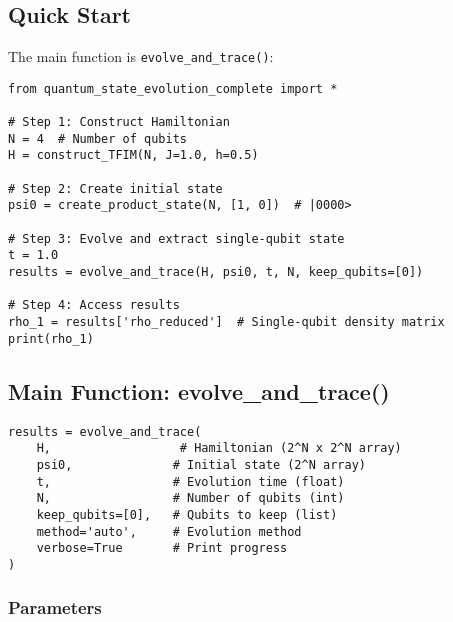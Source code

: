 \documentclass[11pt,a4paper]{article}
\begin{document}
\subsection{Quick Start}

The main function is \texttt{evolve\_and\_trace()}:

\begin{lstlisting}[caption={Basic usage}]
from quantum_state_evolution_complete import *

# Step 1: Construct Hamiltonian
N = 4  # Number of qubits
H = construct_TFIM(N, J=1.0, h=0.5)

# Step 2: Create initial state
psi0 = create_product_state(N, [1, 0])  # |0000>

# Step 3: Evolve and extract single-qubit state
t = 1.0
results = evolve_and_trace(H, psi0, t, N, keep_qubits=[0])

# Step 4: Access results
rho_1 = results['rho_reduced']  # Single-qubit density matrix
print(rho_1)
\end{lstlisting}

\subsection{Main Function: evolve\_and\_trace()}

\begin{lstlisting}[caption={Complete function signature}]
results = evolve_and_trace(
    H,                  # Hamiltonian (2^N x 2^N array)
    psi0,              # Initial state (2^N array)
    t,                 # Evolution time (float)
    N,                 # Number of qubits (int)
    keep_qubits=[0],   # Qubits to keep (list)
    method='auto',     # Evolution method
    verbose=True       # Print progress
)
\end{lstlisting}

\subsubsection{Parameters}
\end{document}
